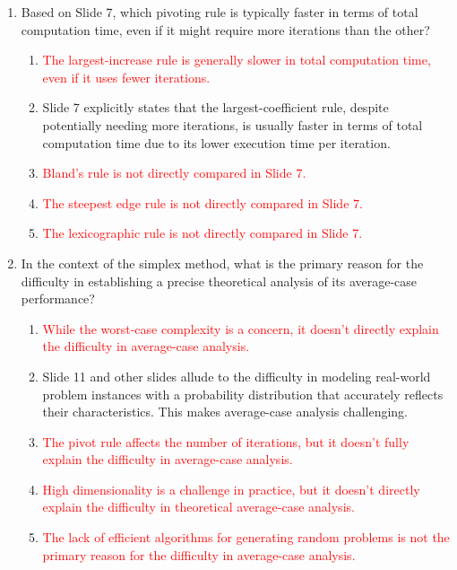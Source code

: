 \documentclass{article}%
\newcommand{\incorrect}[1]{\textcolor{red}{#1}}
\begin{document}
\begin{enumerate}
\begin{enumerate}
\end{enumerate}%
\vspace{1em}%
\item Based on Slide 7, which pivoting rule is typically faster in terms of total computation time, even if it might require more iterations than the other?%
\begin{enumerate}%
\item \incorrect{The largest-increase rule is generally slower in total computation time, even if it uses fewer iterations.}%
\item Slide 7 explicitly states that the largest-coefficient rule, despite potentially needing more iterations, is usually faster in terms of total computation time due to its lower execution time per iteration.%
\item \incorrect{Bland's rule is not directly compared in Slide 7.}%
\item \incorrect{The steepest edge rule is not directly compared in Slide 7.}%
\item \incorrect{The lexicographic rule is not directly compared in Slide 7.}%
\end{enumerate}%
\vspace{1em}%
\item In the context of the simplex method, what is the primary reason for the difficulty in establishing a precise theoretical analysis of its average-case performance?%
\begin{enumerate}%
\item \incorrect{While the worst-case complexity is a concern, it doesn't directly explain the difficulty in average-case analysis.}%
\item Slide 11 and other slides allude to the difficulty in modeling real-world problem instances with a probability distribution that accurately reflects their characteristics. This makes average-case analysis challenging.%
\item \incorrect{The pivot rule affects the number of iterations, but it doesn't fully explain the difficulty in average-case analysis.}%
\item \incorrect{High dimensionality is a challenge in practice, but it doesn't directly explain the difficulty in theoretical average-case analysis.}%
\item \incorrect{The lack of efficient algorithms for generating random problems is not the primary reason for the difficulty in average-case analysis.}%
\end{enumerate}%
\vspace{1em}%

\end{enumerate}
\end{document}
